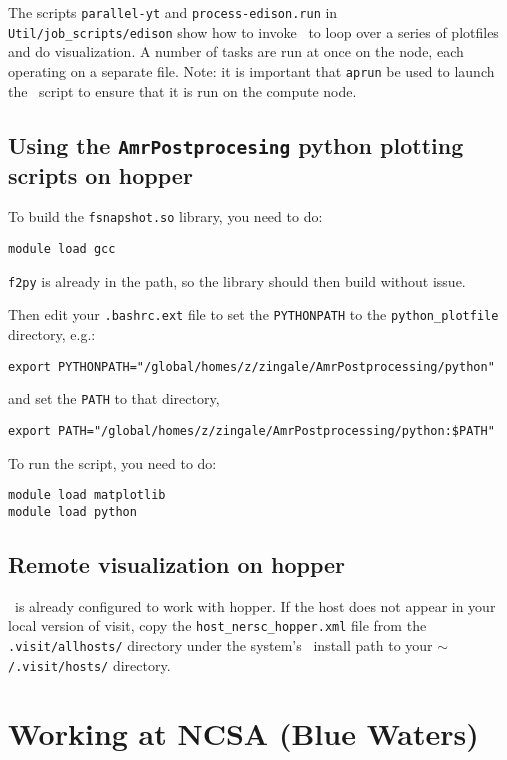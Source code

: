 The scripts {\tt parallel-yt} and {\tt process-edison.run} in {\tt
Util/job\_scripts/edison} show how to invoke \yt\ to loop over a 
series of plotfiles and do visualization.  A number of tasks are
run at once on the node, each operating on a separate file.  Note:
it is important that {\tt aprun} be used to launch the \yt\ script
to ensure that it is run on the compute node.

\subsection{Using the {\tt AmrPostprocesing} python plotting scripts on hopper}

To build the {\tt fsnapshot.so} library, you need to do:
\begin{verbatim}
module load gcc
\end{verbatim}
{\tt f2py} is already in the path, so the library should then build without issue.
%

Then edit your {\tt .bashrc.ext} file to set the {\tt PYTHONPATH} to
the {\tt python\_plotfile} directory, e.g.:
\begin{verbatim}
export PYTHONPATH="/global/homes/z/zingale/AmrPostprocessing/python"
\end{verbatim}
%
and set the {\tt PATH} to that directory,
\begin{verbatim}
export PATH="/global/homes/z/zingale/AmrPostprocessing/python:$PATH"
\end{verbatim}

To run the script, you need to do:
\begin{verbatim}
module load matplotlib
module load python
\end{verbatim}



\subsection{Remote visualization on hopper}

\visit\ is already configured to work with hopper.  If the host does not appear
in your local version of visit, copy the {\tt host\_nersc\_hopper.xml} file
from the {\tt .visit/allhosts/} directory under the system's \visit\ install path
to your {\tt $\mathtt{\sim}$/.visit/hosts/} directory. 



\section{Working at NCSA (Blue Waters)}

